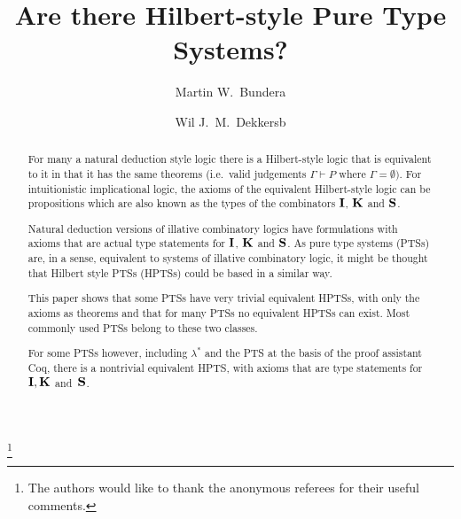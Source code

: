 \documentclass{LMCS}
\begin{document}
\title[Hilbert-style Pure Type Systems?]{Are there Hilbert-style Pure 
  Type Systems?}

\author[M.~W.~Bunder]{Martin W.~Bunder\rsuper a}	\address{{\lsuper a}School of Mathematics and Applied Statistics, 
University of Wollongong, Wollongong, NSW 2522, Australia}	   \thanks{{}The authors would like to thank the anonymous 
referees for their useful comments.}	

\author[W.~.J.~M.~Dekkers]{Wil J.~M.~Dekkers\rsuper b}	\address{{\lsuper b}Department of Computer Science, Radboud 
University Nijmegen, Toernooiveld 1, 6525 ED Nij\-megen, The Netherlands}





\begin{abstract}
  For many a natural deduction style logic there is a Hilbert-style
  logic that is equivalent to it in that it has the same theorems
  (i.e.\ valid judgements $\Gamma\!\vdash\!P$ where
  $\Gamma=\emptyset)$. For intuitionistic implicational logic, the
  axioms of the equivalent Hilbert-style logic can be propositions
  which are also known as the types of the combinators ${\bf I}$,
  ${\bf K}$ and ${\bf S}$.

  Natural deduction versions of illative combinatory logics have
  formulations with axioms that are actual type statements for ${\bf
    I}$, ${\bf K}$ and ${\bf S}$. As pure type systems (PTSs) are, in
  a sense, equivalent to systems of illative combinatory logic, it
  might be thought that Hilbert style PTSs (HPTSs) could be based in a
  similar way.

  This paper shows that some PTSs have very trivial equivalent HPTSs,
  with only the axioms as theorems and that for many PTSs no
  equivalent HPTSs can exist.  Most commonly used PTSs belong to these
  two classes.

  For some PTSs however, including $\lambda^ *$ and the PTS at the
  basis of the proof assistant Coq, there is a nontrivial equivalent
  HPTS, with axioms that are type statements for ${\bf I, K}$ and\
  ${\bf S}$.
\end{abstract}

\maketitle
\end{document}
